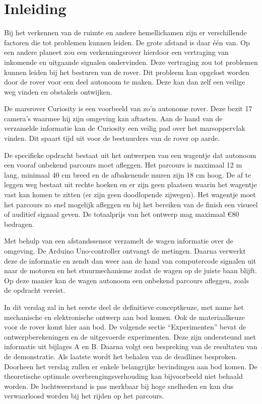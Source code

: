  
\section{Inleiding}
Bij het verkennen van de ruimte en andere hemellichamen zijn er verschillende 
factoren die tot problemen kunnen leiden. De grote afstand is daar één van. Op 
een andere planeet zou een verkenningsrover hierdoor een vertraging van 
inkomende en uitgaande signalen ondervinden. Deze vertraging zou tot problemen 
kunnen leiden bij het besturen van de rover. Dit probleem kan opgelost worden 
door de rover voor een deel autonoom te maken. Deze kan dan zelf een veilige weg 
vinden en obstakels ontwijken.

De marsrover Curiosity is een voorbeeld van zo’n autonome rover. Deze bezit 17 
camera's waarmee hij zijn omgeving kan aftasten. Aan de hand van de verzamelde 
informatie kan de Curiosity een veilig pad over het marsoppervlak vinden. Dit 
spaart tijd uit voor de bestuurders van de rover op aarde.\cite{NASACuriosity, 
NASA2013-259} 

De specifieke opdracht bestaat uit het ontwerpen van een wagentje dat autonoom 
een vooraf onbekend parcours moet afleggen. Het parcours is maximaal 12 m lang, 
minimaal 40 cm breed en de afbakenende muren zijn 18 cm hoog. De af te leggen 
weg bestaat uit rechte hoeken en er zijn geen plaatsen waarin het wagentje vast 
kan komen te zitten (er zijn geen doodlopende zijwegen). Het wagentje moet het 
parcours zo snel mogelijk afleggen en bij het bereiken van de finish een visueel 
of auditief signaal geven. De totaalprijs van het ontwerp mag maximaal \euro 80 
bedragen.

Met behulp van een afstandssensor verzamelt de wagen informatie over de 
omgeving. De Arduino Uno-controller ontvangt de metingen. Daarna verwerkt deze  
de informatie en zendt dan weer aan de hand van computercode signalen uit naar 
de motoren en het stuurmechanisme zodat de wagen op de juiste baan blijft. Op 
deze manier kan de wagen autonoom een onbekend parcours afleggen, zoals 
de opdracht vereist.

In dit verslag zal in het eerste deel de definitieve conceptkeuze, met name het 
mechanische en elektronische ontwerp aan bod komen. Ook de materiaalkeuze voor 
de rover komt hier aan bod. De volgende sectie “Experimenten” bevat de 
ontwerpberekeningen en de uitgevoerde experimenten. Deze zijn ondersteund met 
informatie uit bijlages A en B. Daarna volgt een bespreking van de resultaten 
van de demonstratie. Als laatste wordt het behalen van de deadlines besproken.
Doorheen het verslag zullen er enkele belangrijke bevindingen aan bod komen. De 
theoretische optimale overbrengingsverhouding kan bijvoorbeeld niet behaald 
worden. De luchtweerstand is pas merkbaar bij hoge snelheden en kan dus 
verwaarloosd worden bij het rijden op het parcours.  
